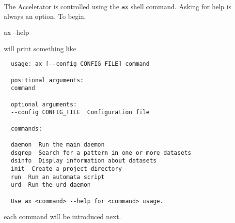 
\newcommand{\cmd}{\texttt{ax}\xspace}





The Accelerator is controlled using the \cmd shell command.  Asking
for help is always an option.  To begin,
\begin{shell}
  ax --help
\end{shell}
will print something like
\begin{snugshade}
\begin{verbatim}
  usage: ax [--config CONFIG_FILE] command

  positional arguments:
  command

  optional arguments:
  --config CONFIG_FILE  Configuration file

  commands:

  daemon  Run the main daemon
  dsgrep  Search for a pattern in one or more datasets
  dsinfo  Display information about datasets
  init  Create a project directory
  run  Run an automata script
  urd  Run the urd daemon

  Use ax <command> --help for <command> usage.
\end{verbatim}
\end{snugshade}
each command will be introduced next.





